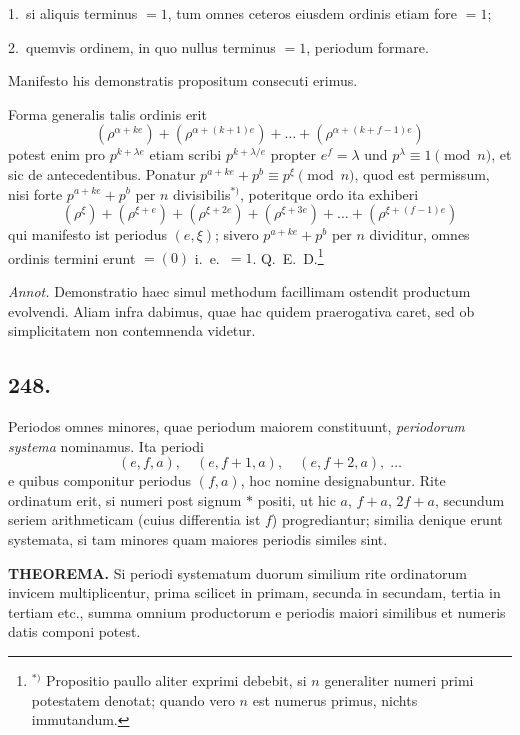 \documentclass[12pt,a4paper]{article}
\begin{document}
1.~si aliquis terminus $=1$, tum omnes ceteros eiusdem ordinis etiam fore $=1$;

2.~quemvis ordinem, in quo nullus terminus $=1$, periodum formare.

Manifesto his demonstratis propositum consecuti erimus.

Forma generalis talis ordinis erit
\[
(\rho^{\alpha+ke}) + (\rho^{\alpha+(k+1)e}) + \ldots + (\rho^{\alpha+(k+f-1)e})
\]
potest enim pro $p^{k+\lambda e}$ etiam scribi $p^{k+\lambda/e}$ propter $e^f=\lambda$ und $p^\lambda\equiv 1\pmod{n}$, et sic de antecedentibus. Ponatur $p^{a+ke}+p^b \equiv p^\xi\pmod{n}$, quod est permissum, nisi forte $p^{a+ke}+p^b$ per $n$ divisibilis$^{*)}$, poteritque ordo ita exhiberi
\[
(\rho^\xi) + (\rho^{\xi+e}) + (\rho^{\xi+2e}) + (\rho^{\xi+3e}) + \ldots + (\rho^{\xi+(f-1)e})
\]
qui manifesto ist periodus $(e,\xi)$; sivero $p^{a+ke}+p^b$ per $n$ dividitur, omnes ordinis termini erunt $=(0)$ i.~e.~$=1$. Q.~E.~D.\footnote{$^{*)}$ Propositio paullo aliter exprimi debebit, si $n$ generaliter numeri primi potestatem denotat; quando vero $n$ est numerus primus, nichts immutandum.}

\textit{Annot.} Demonstratio haec simul methodum facillimam ostendit productum evolvendi. Aliam infra dabimus, quae hac quidem praerogativa caret, sed ob simplicitatem non contemnenda videtur.

\subsection*{248.}

Periodos omnes minores, quae periodum maiorem constituunt, \textit{periodorum systema} nominamus. Ita periodi
\[
(e,f,a),\quad (e,f+1,a),\quad (e,f+2,a),\; \ldots
\]
e quibus componitur periodus $(f,a)$, hoc nomine designabuntur. Rite ordinatum erit, si numeri post signum $*$ positi, ut hic $a$, $f+a$, $2f+a$, secundum seriem arithmeticam (cuius differentia ist $f$) progrediantur; similia denique erunt systemata, si tam minores quam maiores periodis similes sint.

\textbf{THEOREMA.} Si periodi systematum duorum similium rite ordinatorum invicem multiplicentur, prima scilicet in primam, secunda in secundam, tertia in tertiam etc., summa omnium productorum e periodis maiori similibus et numeris datis componi potest.
\end{document}
